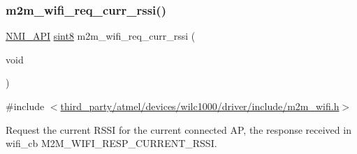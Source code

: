 \subsubsection{\texorpdfstring{m2m\+\_\+wifi\+\_\+req\+\_\+curr\+\_\+rssi()}{m2m\_wifi\_req\_curr\_rssi()}}
{\footnotesize\ttfamily \hyperlink{group__BSPDefine_gaecc0323d771e41ef81a76b5f12783e22}{N\+M\+I\+\_\+\+A\+PI} \hyperlink{group__DataT_gae35f10ffd0ac8dd2bc3e794da9bdfbc7}{sint8} m2m\+\_\+wifi\+\_\+req\+\_\+curr\+\_\+rssi (\begin{DoxyParamCaption}\item[{void}]{ }\end{DoxyParamCaption})}



{\ttfamily \#include $<$\hyperlink{m2m__wifi_8h}{third\+\_\+party/atmel/devices/wilc1000/driver/include/m2m\+\_\+wifi.\+h}$>$}



Request the current R\+S\+SI for the current connected AP, the response received in wifi\+\_\+cb M2\+M\+\_\+\+W\+I\+F\+I\+\_\+\+R\+E\+S\+P\+\_\+\+C\+U\+R\+R\+E\+N\+T\+\_\+\+R\+S\+SI. 

